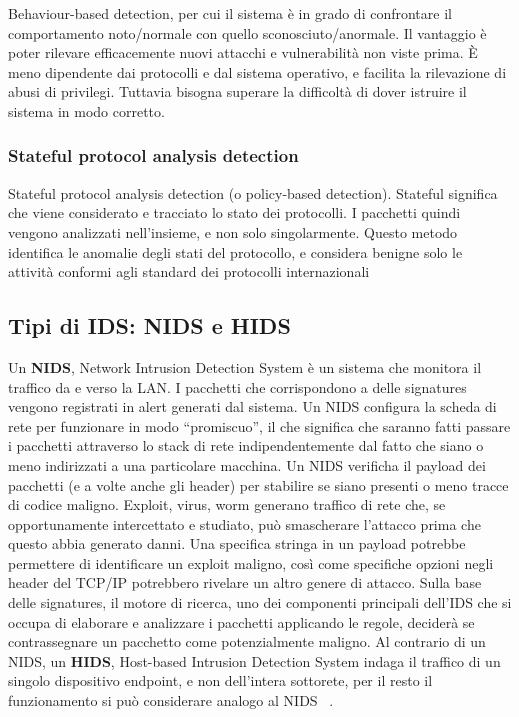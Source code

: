 Behaviour-based detection, per cui il sistema è in grado di confrontare il comportamento noto/normale con quello sconosciuto/anormale. Il vantaggio è poter rilevare efficacemente nuovi attacchi e vulnerabilità non viste prima. È meno dipendente dai protocolli e dal sistema operativo, e facilita la rilevazione di abusi di privilegi. Tuttavia bisogna superare la difficoltà di dover istruire il sistema in modo corretto.

\subsubsection{Stateful protocol analysis detection}

Stateful protocol analysis detection (o policy-based detection). Stateful significa che viene considerato e tracciato lo stato dei protocolli. I pacchetti quindi vengono analizzati nell’insieme, e non solo singolarmente. Questo metodo identifica le anomalie degli stati del protocollo, e considera benigne solo le attività conformi agli standard dei protocolli internazionali

\subsection{Tipi di IDS: NIDS e HIDS}

Un \textbf{NIDS}, Network Intrusion Detection System è un sistema che monitora il traffico da e verso la LAN. I pacchetti che corrispondono a delle signatures vengono registrati in alert generati dal sistema. Un NIDS configura la scheda di rete per funzionare in modo “promiscuo”, il che significa che saranno fatti passare i pacchetti attraverso lo stack di rete indipendentemente dal fatto che siano o meno indirizzati a una particolare macchina. Un NIDS verificha il payload dei pacchetti (e a volte anche gli header) per stabilire se siano presenti o meno tracce di codice maligno. Exploit, virus, worm generano traffico di rete che, se opportunamente intercettato e studiato, può smascherare l'attacco prima che questo abbia generato danni. Una specifica stringa in un payload potrebbe permettere di identificare un exploit maligno, così come specifiche opzioni negli header del TCP/IP potrebbero rivelare un altro genere di attacco. Sulla base delle signatures, il motore di ricerca, uno dei componenti principali dell'IDS che si occupa di elaborare e analizzare i pacchetti applicando le regole, deciderà se contrassegnare un pacchetto come potenzialmente maligno. Al contrario di un NIDS, un \textbf{HIDS}, Host-based Intrusion Detection System indaga il traffico di un singolo dispositivo endpoint, e non dell'intera sottorete, per il resto il funzionamento si può considerare analogo al NIDS ~\cite{zerounoweb}.

